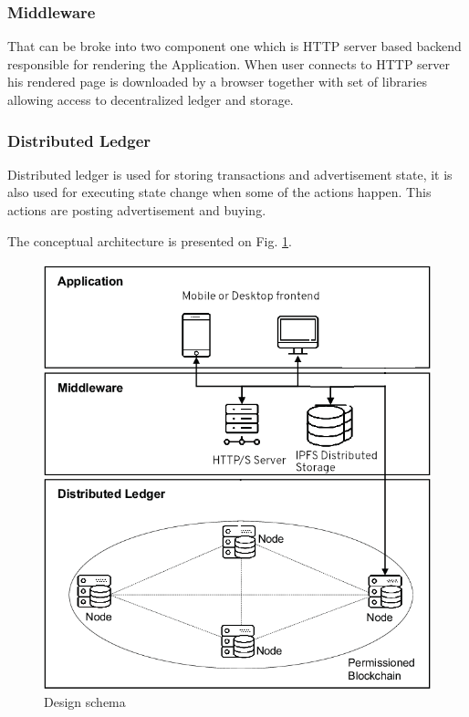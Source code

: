 \documentclass[journal]{IEEEtran} %
\begin{document}
        \subsubsection{Middleware}
            That can be broke into two component one which is HTTP server based backend responsible for rendering the Application. When user connects to HTTP server his rendered page is downloaded by a browser together with set of libraries allowing access to decentralized ledger and storage.\\
        
        \subsubsection{Distributed Ledger}
            Distributed ledger is used for storing transactions and advertisement state, it is also used for executing state change when some of the actions happen. This actions are posting advertisement and buying. 
    
        The conceptual architecture is presented on Fig. \ref{fig}.
        
        \begin{figure}[htbp]
            \centerline{\includegraphics{arch.png}}
            \caption{Design schema}
            \label{fig}
        \end{figure}
    
\end{document}
